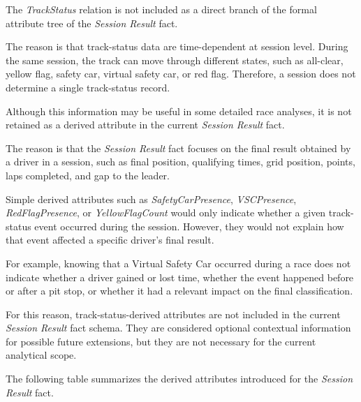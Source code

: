 \documentclass[a4paper,11pt]{article}
\begin{document}
	
	The \textit{TrackStatus} relation is not included as a direct branch of the formal
	attribute tree of the \textit{Session Result} fact.
	
	The reason is that track-status data are time-dependent at session level. During the same
	session, the track can move through different states, such as all-clear, yellow flag,
	safety car, virtual safety car, or red flag. Therefore, a session does not determine a
	single track-status record.
	
	Although this information may be useful in some detailed race analyses, it is not retained
	as a derived attribute in the current \textit{Session Result} fact.
	
	The reason is that the \textit{Session Result} fact focuses on the final result obtained by
	a driver in a session, such as final position, qualifying times, grid position, points, laps
	completed, and gap to the leader.
	
	Simple derived attributes such as \textit{SafetyCarPresence}, \textit{VSCPresence},
	\textit{RedFlagPresence}, or \textit{YellowFlagCount} would only indicate whether a given
	track-status event occurred during the session. However, they would not explain how that
	event affected a specific driver's final result.
	
	For example, knowing that a Virtual Safety Car occurred during a race does not indicate
	whether a driver gained or lost time, whether the event happened before or after a pit
	stop, or whether it had a relevant impact on the final classification.
	
	For this reason, track-status-derived attributes are not included in the current
	\textit{Session Result} fact schema. They are considered optional contextual information
	for possible future extensions, but they are not necessary for the current analytical scope.

	

	
	The following table summarizes the derived attributes introduced for the
	\textit{Session Result} fact.
	
\end{document}
